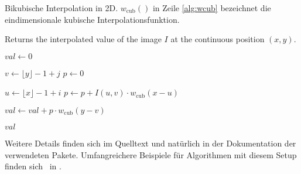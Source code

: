 \begin{algorithm}[tbp]
\caption{Bikubische Interpolation in 2D.
	$w_{\mathrm{cub}}()$ in Zeile \ref{alg:wcub} bezeichnet die 
	eindimensionale kubische Interpolationsfunktion.}
\label{alg:Example}

\begin{algorithmic}[1]     %
 
	\Statex Returns the interpolated value of the image $I$ 
					at the continuous position $(x, y)$.
	
	\State $\mathit{val} \gets 0$
	
	 
		\State $v \gets \lfloor y \rfloor - 1 + j$
		\State $p \gets 0$
		
		 
			\State $u \gets \lfloor x \rfloor - 1 + i$
			\State $p \gets p + I(u,v) \cdot w_{\mathrm{cub}}(x - u )$
					\label{alg:wcub}
		\EndFor
		
		\State $\mathit{val} \gets \mathit{val} + p \cdot w_{\mathrm{cub}}(y - v)$
	\EndFor
	
	\State\Return $\mathit{val}$
	
\EndProcedure
\end{algorithmic}
\end{algorithm}


Weitere Details finden sich im Quelltext und natürlich in der Dokumentation der verwendeten Pakete.
Umfangreichere Beispiele für Algorithmen mit diesem Setup finden sich \ua\ in \cite{BurgerBurge2015}.

